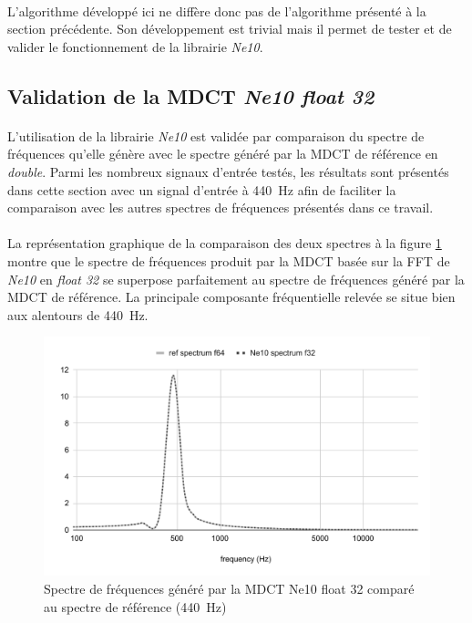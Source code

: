 \documentclass{article}
\begin{document}
    \paragraph{}
    L'algorithme développé ici ne diffère donc pas de l'algorithme présenté à la section précédente. Son développement est trivial mais il permet de tester et de valider le fonctionnement de la librairie \emph{Ne10}.

    \subsection{Validation de la MDCT \emph{Ne10 float 32}}
    \paragraph{}
    L'utilisation de la librairie \emph{Ne10} est validée par comparaison du spectre de fréquences qu'elle génère avec le spectre généré par la MDCT de référence en \emph{double}. Parmi les nombreux signaux d'entrée testés, les résultats sont présentés dans cette section avec un signal d'entrée à \SI{440}{\hertz} afin de faciliter la comparaison avec les autres spectres de fréquences présentés dans ce travail.

    \paragraph{}
    La représentation graphique de la comparaison des deux spectres à la figure \ref{fig:validation_ne10_f32} montre que le spectre de fréquences produit par la MDCT basée sur la FFT de \emph{Ne10} en \emph{float 32} se superpose parfaitement au spectre de fréquences généré par la MDCT de référence. La principale composante fréquentielle relevée se situe bien aux alentours de \SI{440}{\hertz}.
    \begin{figure}[H]
        \centering
        \includegraphics[width=.8\linewidth]{./images/validation_ne10_f32.pdf}
        \caption{Spectre de fréquences généré par la MDCT Ne10 float 32 comparé au spectre de référence (\SI{440}{\hertz})}
        \label{fig:validation_ne10_f32}
    \end{figure}
\end{document}
